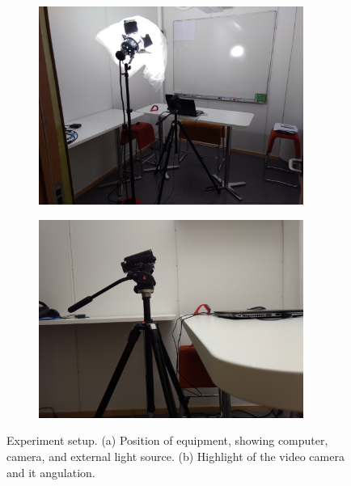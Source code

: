 \begin{figure}[ht]
\centering
  \begin{subfigure}[b]{0.5\textwidth}
    \includegraphics[width=0.95\textwidth]{figures/experiment2-setup-overall}
    \caption{}
    \label{fig:experiment2-setup-overall}
  \end{subfigure}%
  \begin{subfigure}[b]{0.5\textwidth}
    \centering
    \includegraphics[width=0.95\textwidth]{figures/experiment2-setup-camera}
    \caption{}
    \label{fig:experiment2-setup-camera}
  \end{subfigure}
  \caption{Experiment setup. (a) Position of equipment, showing computer, camera, and external light source. (b) Highlight of the video camera and it angulation.}
  \label{fig:experiment2-setup}
\end{figure}

